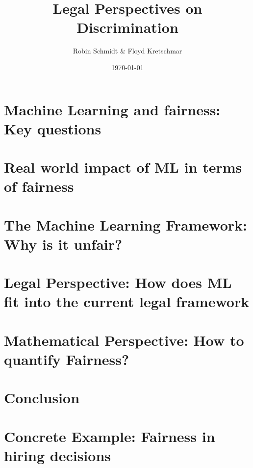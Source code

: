 \documentclass[9pt, t, aspectratio=169]{beamer}
\title{Legal Perspectives on Discrimination}
\subtitle{Robin Schmidt \& Floyd Kretschmar}
\institute{\texttt{[image: assets/uni\_logo\_dark.png]}}
\date{\today}
\begin{document}
\titlepage

\section{Machine Learning and fairness: Key questions}


\section{Real world impact of ML in terms of fairness}


\section{The Machine Learning Framework: Why is it unfair?}


\section{Legal Perspective: How does ML fit into the current legal framework}


\section{Mathematical Perspective: How to quantify Fairness?}


\section{Conclusion}


\section{Concrete Example: Fairness in hiring decisions}

\end{document}

